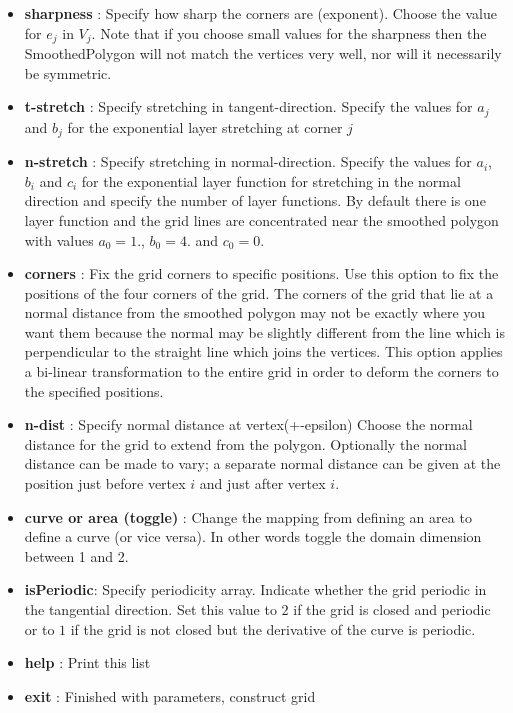 \begin{itemize}
  \item {\bf sharpness} : Specify how sharp the corners are (exponent). 
        Choose the value for $e_j$ in $V_j$.
        Note that if you choose small values for the sharpness then the SmoothedPolygon
         will not match the vertices very well, nor will it necessarily be symmetric.
  \item {\bf t-stretch} : Specify stretching in tangent-direction. Specify
        the values for $a_j$ and $b_j$ for the exponential layer stretching
        at corner $j$
  \item {\bf n-stretch} : Specify stretching in normal-direction. Specify
        the values for $a_i$, $b_i$ and $c_i$ for the exponential layer function
        for stretching in the normal direction and specify the number of
        layer functions. By default there is one layer function and the grid lines
        are concentrated near the smoothed polygon with values 
        $a_0=1.$, $b_0=4.$ and $c_0=0.$
  \item {\bf corners  } : Fix the grid corners to specific positions. Use this
        option to fix the positions of the four corners of the grid. The corners
        of the grid that lie at a normal distance from the smoothed polygon
        may not be exactly where you want them because the normal may be
        slightly different from the line which is perpendicular to the 
        straight line which joins the vertices. This option applies a bi-linear
        transformation to the entire grid in order to deform the corners to the
        specified positions.
  \item {\bf n-dist   } : Specify normal distance at vertex(+-epsilon)
        Choose the normal distance for the grid to extend from the
        polygon. Optionally the normal distance can be made to vary;
        a separate normal distance can be given at the position just
        before vertex $i$ and just after vertex $i$. 
  \item {\bf curve or area (toggle)} : Change the mapping from defining an area to
        define a curve (or vice versa). In other words toggle the domain dimension between 1 and 2.
  \item {\bf isPeriodic}: Specify periodicity array.
         Indicate whether the grid periodic in the tangential direction.
         Set this value to $2$ if the grid is closed and periodic
         or to $1$ if the grid is not closed but the derivative of the
         curve is periodic.
  \item {\bf help     } : Print this list
  \item {\bf exit     } : Finished with parameters, construct grid
\end{itemize}

